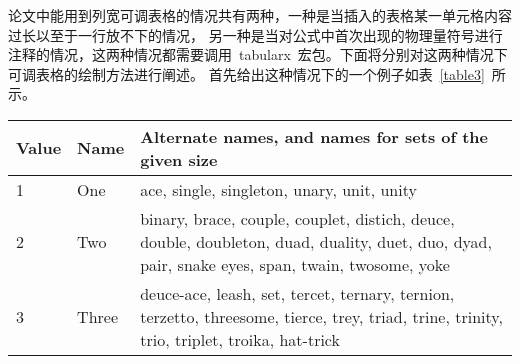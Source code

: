 论文中能用到列宽可调表格的情况共有两种，一种是当插入的表格某一单元格内容过长以至于一行放不下的情况，
另一种是当对公式中首次出现的物理量符号进行注释的情况，这两种情况都需要调用~tabularx~宏包。下面将分别对这两种情况下可调表格的绘制方法进行阐述。
首先给出这种情况下的一个例子如表~\ref{table3}~所示。
\begin{table}[htbp]
\vspace{0.5em}\wuhao
\begin{tabularx}{\textwidth}{llX}
\toprule[1.5pt]
Value & Name & Alternate names, and names for sets of the given size\\\midrule[1pt]
1 & One & ace, single, singleton, unary, unit, unity\\
2 & Two & binary, brace, couple, couplet, distich, deuce, double, doubleton, duad, duality, duet, duo, dyad, pair, snake eyes, span, twain, twosome, yoke\\
3 & Three & deuce-ace, leash, set, tercet, ternary, ternion, terzetto, threesome, tierce, trey, triad, trine, trinity, trio, triplet, troika, hat-trick\\\bottomrule[1.5pt]
\end{tabularx}
\end{table}

